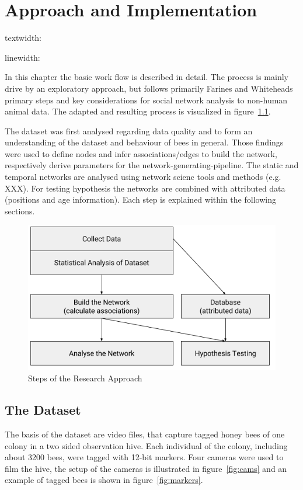 \chapter{Approach and Implementation}
\label{ch:approach}

textwidth: \prntlen{\textwidth}

linewidth: \prntlen{\linewidth}

In this chapter the basic work flow is described in detail. The process is mainly drive by an exploratory approach, but follows primarily Farines and Whiteheads~\cite{farine2015constructing} primary steps and key considerations for social network analysis to non-human animal data. The adapted and resulting process is visualized in figure~\ref{fig:process}.

The dataset was first analysed regarding data quality and to form an understanding of the dataset and behaviour of bees in general. Those findings were used to define nodes and infer associations/edges to build the network, respectively derive parameters for the network-generating-pipeline. The static and temporal networks are analysed using network scienc tools and methods (e.g. XXX). For testing hypothesis the networks are combined with attributed data (positions and age information). Each step is explained within the following sections.

\begin{figure}[htb]
	\centering
	\includegraphics[width=1.0\textwidth]{Figures/WorkProcess}
	\caption{Steps of the Research Approach}
	\label{fig:process}
\end{figure}


\section{The Dataset}
\label{sec:dataset}
The basis of the dataset are video files, that capture tagged honey bees of one colony in a two sided observation hive.
Each individual of the colony, including about 3200 bees, were tagged with 12-bit markers. Four cameras were used to film the hive, the setup of the cameras is illustrated in figure~\ref{fig:cams} and an example of tagged bees is shown in figure~\ref{fig:markers}.

